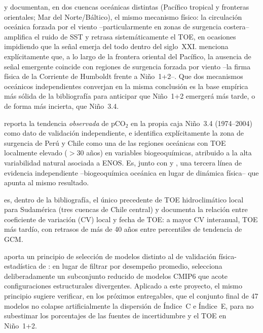 \documentclass[11pt,a4paper]{article}
\begin{document}
\citet{larson2025} y \citet{poul2025} documentan, en dos cuencas oceánicas distintas (Pacífico tropical y fronteras orientales; Mar del Norte/Báltico), el mismo mecanismo físico: la circulación oceánica forzada por el viento --particularmente en zonas de surgencia costera-- amplifica el ruido de SST y retrasa sistemáticamente el TOE, en ocasiones impidiendo que la señal emerja del todo dentro del siglo~XXI. \citet{larson2025} menciona explícitamente que, a lo largo de la frontera oriental del Pacífico, la ausencia de señal emergente coincide con regiones de surgencia forzada por viento --la firma física de la Corriente de Humboldt frente a Ni\~no~1+2--. Que dos mecanismos oceánicos independientes converjan en la misma conclusión es la base empírica más sólida de la bibliografía para anticipar que Ni\~no~1+2 emergerá más tarde, o de forma más incierta, que Ni\~no~3.4.

\citet{keller2014} reporta la tendencia \emph{observada} de pCO$_2$ en la propia caja Ni\~no~3.4 (1974--2004) como dato de validación independiente, e identifica explícitamente la zona de surgencia de Perú y Chile como una de las regiones oceánicas con TOE localmente elevado ($>$30 años) en variables biogeoquímicas, atribuido a la alta variabilidad natural asociada a ENOS. Es, junto con \citet{larson2025} y \citet{poul2025}, una tercera línea de evidencia independiente --biogeoquímica oceánica en lugar de dinámica física-- que apunta al mismo resultado.

\citet{chadwick2019} es, dentro de la bibliografía, el único precedente de TOE hidroclimático local para Sudamérica (tres cuencas de Chile central) y documenta la relación entre coeficiente de variación (CV) local y fecha de TOE: a mayor CV interanual, TOE más tardío, con retrasos de más de 40 años entre percentiles de tendencia de GCM. 

\citet{lois2026} aporta un principio de selección de modelos distinto al de validación física-estadística de \citet{bruno2023}: en lugar de filtrar por desempeño promedio, selecciona deliberadamente un subconjunto reducido de modelos CMIP6 que acote configuraciones estructurales divergentes. Aplicado a este proyecto, el mismo principio sugiere verificar, en los próximos entregables, que el conjunto final de 47 modelos no colapse artificialmente la dispersión de Índice~C e Índice~E, para no subestimar los porcentajes de las fuentes de incertidumbre y el TOE en Ni\~no~1+2.
\end{document}
